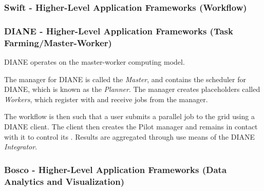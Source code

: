 \documentclass{sig-alternate}
\begin{document}
\subsubsection{Swift - Higher-Level Application Frameworks (Workflow)}

\subsubsection{DIANE - Higher-Level Application Frameworks 
  (Task Farming/Master-Worker)}
DIANE operates on the master-worker computing model.

The manager for DIANE is called the \textit{Master}, and contains
the scheduler for DIANE, which is known as the \textit{Planner}.
The manager creates placeholders called \textit{Workers}, which
register with and receive jobs from the manager.

The workflow is then such that a user submits a parallel job to
the grid using a DIANE client.  The client then creates the Pilot manager
and remains in contact with it to control its \pilotjobs.  Results
are aggregated through use means of the DIANE \textit{Integrator}.

\subsubsection{Bosco - Higher-Level Application Frameworks 
  (Data Analytics and Visualization)}

\end{document}
